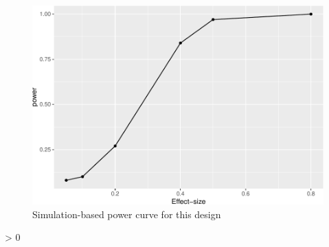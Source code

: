 \documentclass[
  english,
  man]{article}
\newlength{\cslhangindent}
\newenvironment{CSLReferences}[2] %
 {%
  \setlength{\parindent}{0pt}
  \ifodd #1 \everypar{\setlength{\hangindent}{\cslhangindent}}\ignorespaces\fi
  \ifnum #2 > 0
  \setlength{\parskip}{#2\baselineskip}
  \fi
 }%
 {}
\begin{document}
\begin{figure}
\centering
\includegraphics{semester-project-example_files/figure-latex/powerfig-1.pdf}
\caption{\label{fig:powerfig}Simulation-based power curve for this design}
\end{figure}

\newpage

\begingroup
\setlength{\parindent}{-0.5in}
\setlength{\leftskip}{0.5in}

\hypertarget{refs}{}
\begin{CSLReferences}{0}{0}
\end{CSLReferences}

\endgroup
\end{document}
